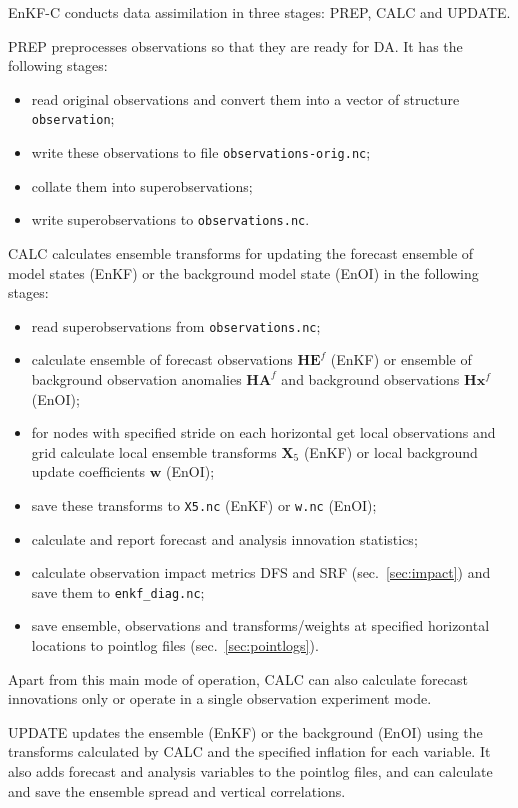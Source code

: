 \documentclass[11pt]{report}
\newcommand{\mb} {\mathbf}
\begin{document}
EnKF-C conducts data assimilation in three stages: PREP, CALC and UPDATE.

PREP preprocesses observations so that they are ready for DA.
It has the following stages:
\begin{itemize}
\item read original observations and convert them into a vector of structure \verb|observation|;
\item write these observations to file \verb|observations-orig.nc|;
\item collate them into superobservations;
\item write superobservations to \verb|observations.nc|.
\end{itemize}

CALC calculates ensemble transforms for updating the forecast ensemble of model states (EnKF) or the background model state (EnOI) in the following stages:
\begin{itemize}
\item read superobservations from \verb|observations.nc|;
\item calculate ensemble of forecast observations $\mb H \mb E^f$ (EnKF) or ensemble of background observation anomalies $\mb H \mb A^f$ and background observations $\mb H \mb x^f$ (EnOI);
\item for nodes with specified stride on each horizontal get local observations and grid calculate local ensemble transforms $\mb X_5$ (EnKF) or local background update coefficients $\mb w$ (EnOI);
\item save these transforms to \verb|X5.nc| (EnKF) or \verb|w.nc| (EnOI);
\item calculate and report forecast and analysis innovation statistics;
\item calculate observation impact metrics DFS and SRF (sec.~\ref{sec:impact}) and save them to \verb|enkf_diag.nc|;
\item save ensemble, observations and transforms/weights at specified horizontal locations to pointlog files (sec.~\ref{sec:pointlogs}).
\end{itemize}
Apart from this main mode of operation, CALC can also calculate forecast  innovations only or operate in a single observation experiment mode.

UPDATE updates the ensemble (EnKF) or the background (EnOI) using the transforms calculated by CALC and the specified inflation for each variable.
It also adds forecast and analysis variables to the pointlog files, and can calculate and save the ensemble spread and vertical correlations.
\end{document}
